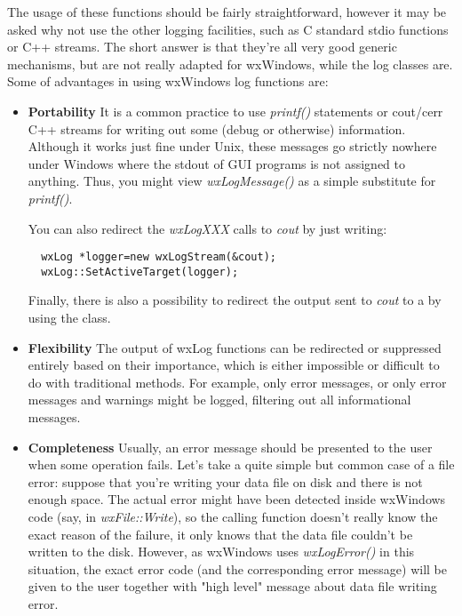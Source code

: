 The usage of these functions should be fairly straightforward, however it may
be asked why not use the other logging facilities, such as C standard stdio
functions or C++ streams. The short answer is that they're all very good
generic mechanisms, but are not really adapted for wxWindows, while the log
classes are. Some of advantages in using wxWindows log functions are:

\begin{itemize}\itemsep=0pt
\item{\bf Portability} It is a common practice to use {\it printf()}
statements or cout/cerr C++ streams for writing out some (debug or otherwise)
information.
Although it works just fine under Unix, these messages go strictly nowhere
under Windows where the stdout of GUI programs is not assigned to anything.
Thus, you might view {\it wxLogMessage()} as a simple substitute for {\it
printf()}.

You can also redirect the {\it wxLogXXX} calls to {\it cout} by just writing:
{\small
\begin{verbatim}
  wxLog *logger=new wxLogStream(&cout);
  wxLog::SetActiveTarget(logger);
\end{verbatim}
}

Finally, there is also a possibility to redirect the output sent to {\it cout} 
to a  by using the 
 class.

\item{\bf Flexibility} The output of wxLog functions can be redirected or
suppressed entirely based on their importance, which is either impossible or
difficult to do with traditional methods. For example, only error messages, or
only error messages and warnings might be logged, filtering out all
informational messages.
\item{\bf Completeness} Usually, an error message should be presented to the user
when some operation fails. Let's take a quite simple but common case of a file
error: suppose that you're writing your data file on disk and there is not
enough space. The actual error might have been detected inside wxWindows code
(say, in {\it wxFile::Write}), so the calling function doesn't really know the
exact reason of the failure, it only knows that the data file couldn't be
written to the disk. However, as wxWindows uses {\it wxLogError()} in this
situation, the exact error code (and the corresponding error message) will be
given to the user together with "high level" message about data file writing
error.
\end{itemize}

